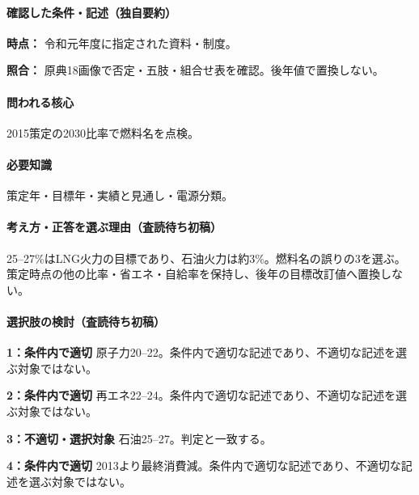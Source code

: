 \paragraph{確認した条件・記述（独自要約）}\mbox{}\par

\noindent\textbf{時点：} 令和元年度に指定された資料・制度。\par

\noindent\textbf{照合：} 原典18画像で否定・五肢・組合せ表を確認。後年値で置換しない。\par

\paragraph{問われる核心} 2015策定の2030比率で燃料名を点検。

\paragraph{必要知識} 策定年・目標年・実績と見通し・電源分類。

\paragraph{考え方・正答を選ぶ理由（査読待ち初稿）} 25–27\%はLNG火力の目標であり、石油火力は約3\%。燃料名の誤りの3を選ぶ。策定時点の他の比率・省エネ・自給率を保持し、後年の目標改訂値へ置換しない。

\paragraph{選択肢の検討（査読待ち初稿）}\mbox{}\par

\noindent\textbf{1：条件内で適切} 原子力20–22。条件内で適切な記述であり、不適切な記述を選ぶ対象ではない。\par

\noindent\textbf{2：条件内で適切} 再エネ22–24。条件内で適切な記述であり、不適切な記述を選ぶ対象ではない。\par

\noindent\textbf{3：不適切・選択対象} 石油25–27。判定と一致する。\par

\noindent\textbf{4：条件内で適切} 2013より最終消費減。条件内で適切な記述であり、不適切な記述を選ぶ対象ではない。\par


